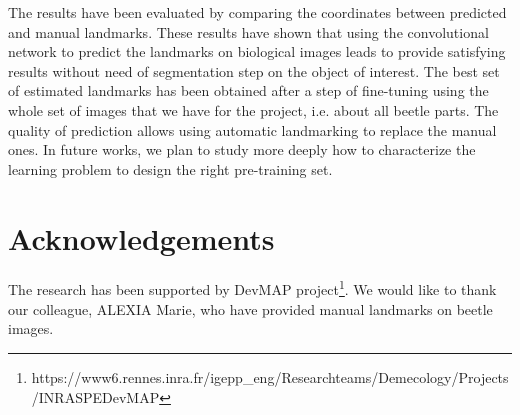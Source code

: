 \documentclass[10pt]{article}
\begin{document}
The results have been evaluated by comparing the coordinates between predicted and manual landmarks.  These results have shown that using the convolutional network to predict the landmarks on biological images leads to provide satisfying results without need of segmentation step on the object of interest. The best set of estimated landmarks has been obtained after a step of fine-tuning using the whole set of images that we have for the project, i.e. about all beetle parts. The quality of prediction allows using automatic landmarking to replace the manual ones. In future works, we plan to study more deeply how to characterize the learning problem to design the right pre-training set.

\section*{Acknowledgements}
The research has been supported by DevMAP project\footnote{https://www6.rennes.inra.fr/igepp\_eng/Research\-teams/Demecology/Projects/INRA\-SPE\-DevMAP}. We would like to thank our colleague, ALEXIA Marie, who have provided manual landmarks on beetle images.


\end{document}
